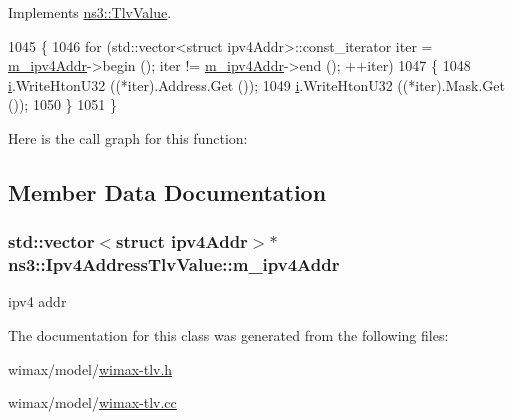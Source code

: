 Implements \hyperlink{classns3_1_1TlvValue_aeec8825728398e18337efd9cb40a2aa4}{ns3\+::\+Tlv\+Value}.


\begin{DoxyCode}
1045 \{
1046   \textcolor{keywordflow}{for} (std::vector<struct ipv4Addr>::const\_iterator iter = \hyperlink{classns3_1_1Ipv4AddressTlvValue_a2236e0df99e865a6d3afb0ed13b7cb1a}{m\_ipv4Addr}->begin (); iter != 
      \hyperlink{classns3_1_1Ipv4AddressTlvValue_a2236e0df99e865a6d3afb0ed13b7cb1a}{m\_ipv4Addr}->end (); ++iter)
1047     \{
1048       \hyperlink{bernuolliDistribution_8m_a6f6ccfcf58b31cb6412107d9d5281426}{i}.WriteHtonU32 ((*iter).Address.Get ());
1049       \hyperlink{bernuolliDistribution_8m_a6f6ccfcf58b31cb6412107d9d5281426}{i}.WriteHtonU32 ((*iter).Mask.Get ());
1050     \}
1051 \}
\end{DoxyCode}


Here is the call graph for this function\+:




\subsection{Member Data Documentation}
\subsubsection[{\texorpdfstring{m\+\_\+ipv4\+Addr}{m_ipv4Addr}}]{\setlength{\rightskip}{0pt plus 5cm}std\+::vector$<$struct {\bf ipv4\+Addr}$>$$\ast$ ns3\+::\+Ipv4\+Address\+Tlv\+Value\+::m\+\_\+ipv4\+Addr\hspace{0.3cm}{\ttfamily [private]}}\hypertarget{classns3_1_1Ipv4AddressTlvValue_a2236e0df99e865a6d3afb0ed13b7cb1a}{}\label{classns3_1_1Ipv4AddressTlvValue_a2236e0df99e865a6d3afb0ed13b7cb1a}


ipv4 addr 



The documentation for this class was generated from the following files\+:\begin{DoxyCompactItemize}
\item 
wimax/model/\hyperlink{wimax-tlv_8h}{wimax-\/tlv.\+h}\item 
wimax/model/\hyperlink{wimax-tlv_8cc}{wimax-\/tlv.\+cc}\end{DoxyCompactItemize}
